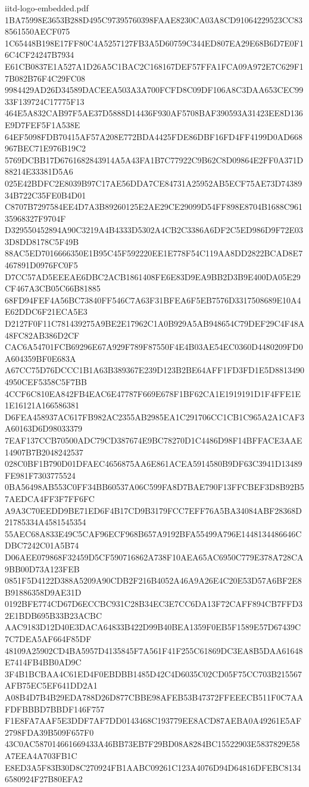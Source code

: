 \begin{filecontents*}[overwrite]{iitd-logo-embedded.pdf}
1BA75998E3653B288D495C97395760398FAAE8230CA03A8CD91064229523CC838561550AECF075
1C65448B198E17FF80C4A5257127FB3A5D60759C344ED807EA29E68B6D7E0F16C4CF24247B7934
E61CB0837E1A527A1D26A5C1BAC2C168167DEF57FFA1FCA09A972E7C629F17B082B76F4C29FC08
9984429AD26D34589DACEEA503A3A700FCFD8C09DF106A8C3DAA653CEC9933F139724C17775F13
464E5A832CAB97F5AE37D5888D14436F930AF5708BAF390593A31423EE8D136E9D7FEF5F1A538E
64EF5098FDB70415AF57A208E772BDA4425FDE86DBF16FD4FF4199D0AD668967BEC71E976B19C2
5769DCBB17D6761682843914A5A43FA1B7C77922C9B62C8D09864E2FF0A371D88214E33381D5A6
025E42BDFC2E8039B97C17AE56DDA7CE84731A25952AB5ECF75AE73D7438934B722C35FE0B4D01
C8707B7297584EE4D7A3B89260125E2AE29CE29099D54FF898E8704B1688C96135968327F9704F
D329550452894A90C3219A4B4333D5302A4CB2C3386A6DF2C5ED986D9F72E033D8DD8178C5F49B
88AC5ED7016666350E1B95C45F592220EE1E778F54C119AA8DD2822BCAD8E7467891D0976FC0F5
D7CC57AD5EEEAE6DBC2ACB1861408FE6E83D9EA9BB2D3B9E400DA05E29CF467A3CB05C66B81885
68FD94FEF4A56BC73840FF546C7A63F31BFEA6F5EB7576D3317508689E10A4E62DDC6F21ECA5E3
D2127F0F11C781439275A9BE2E17962C1A0B929A5AB948654C79DEF29C4F48A48FC82AB386D2CF
CAC6A54701FCB69296E67A929F789F87550F4E4B03AE54EC0360D4480209FD0A604359BF0E683A
A67CC75D76DCCC1B1A63B389367E239D123B2BE64AFF1FD3FD1E5D88134904950CEF5358C5F7BB
4CCF6C810EA842FB4EAC6E47787F669E678F1BF62CA1E1919191D1F4FFE1E1E16121A166586381
D6FEA458937AC617FB982AC2355AB2985EA1C291706CC1CB1C965A2A1CAF3A60163D6D98033379
7EAF137CCB70500ADC79CD387674E9BC78270D1C4486D98F14BFFACE3AAE14907B7B2048242537
028C0BF1B790D01DFAEC4656875AA6E861ACEA5914580B9DF63C3941D13489FE981F7303775524
0BA56498AB553C0FF34BB60537A06C599FA8D7BAE790F13FFCBEF3D8B92B57AEDCA4FF3F7FF6FC
A9A3C70EEDD9BE71ED6F4B17CD9B3179FCC7EFF76A5BA34084ABF28368D21785334A4581545354
55AEC68A833E49C5CAF96ECF968B657A9192BFA55499A796E1448134486646CDBC7242C01A5B74
D06AEE079868F32459D5CF590716862A738F10AEA65AC6950C779E378A728CA9BB00D73A123FEB
0851F5D4122D388A5209A90CDB2F216B4052A46A9A26E4C20E53D57A6BF2E8B91886358D9AE31D
0192BFE774CD67D6ECCBC931C28B34EC3E7CC6DA13F72CAFF894CB7FFD32E1BDB695B33B23ACBC
AAC9183D12D40E3DACA64833B422D99B40BEA1359F0EB5F1589E57D67439C7C7DEA5AF664F85DF
48109A25902CD4BA5957D4135845F7A561F41F255C61869DC3EA8B5DAA61648E7414FB4BB0AD9C
3F4B1BCBAA4C61ED4F0EBDBB1485D42C4D6035C02CD05F75CC703B215567AFB75EC5EF641DD2A1
A08B4D7B4B29EDA788D26D877CBBE98AFEB53B47372FFEEECB511F0C7AAFDFBBBD7BBDF146F757
F1E8FA7AAF5E3DDF7AF7DD0143468C193779EE8ACD87AEBA0A49261E5AF2798FDA39B509F657F0
43C0AC587014661669433A46BB73EB7F29BD08A8284BC15522903E5837829E58A7EEA4A703FB1C
E8ED3A5F83B30D8C270924FB1AABC09261C123A4076D94D64816DFEBC81346580924F27B80EFA2

\end{filecontents*}
